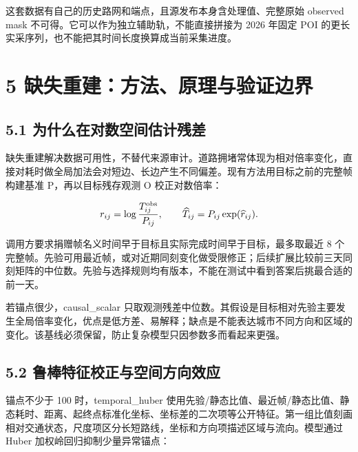 \documentclass[UTF8,10pt,a4paper,fontset=fandol]{ctexart}
\begin{document}
这套数据有自己的历史路网和端点，且源发布本身含处理值、完整原始 observed mask 不可得。它可以作为独立辅助轨，不能直接拼接为 2026 年固定 POI 的更长实采序列，也不能把其时间长度换算成当前采集进度。


\section*{5 缺失重建：方法、原理与验证边界}


\subsection*{5.1 为什么在对数空间估计残差}


缺失重建解决数据可用性，不替代来源审计。道路拥堵常体现为相对倍率变化，直接对耗时做全局加法会对短边、长边产生不同偏差。现有方法用目标之前的完整帧构建基准 P，再以目标残存观测 O 校正对数倍率：


\begin{equation}
r_{ij}=\log\frac{T^{\rm obs}_{ij}}{P_{ij}},
\qquad
\widehat T_{ij}=P_{ij}\exp(\widehat r_{ij}).
\end{equation}

调用方要求捐赠帧名义时间早于目标且实际完成时间早于目标，最多取最近 8 个完整帧。先验可用最近帧，或对近期同刻变化做受限修正；后续扩展比较前三天同刻矩阵的中位数。先验与选择规则均有版本，不能在测试中看到答案后挑最合适的前一天。


若锚点很少，causal\_\allowbreak{}scalar 只取观测残差中位数。其假设是目标相对先验主要发生全局倍率变化，优点是低方差、易解释；缺点是不能表达城市不同方向和区域的变化。该基线必须保留，防止复杂模型只因参数多而看起来更强。


\subsection*{5.2 鲁棒特征校正与空间方向效应}


锚点不少于 100 时，temporal\_\allowbreak{}huber 使用先验/\allowbreak{}静态比值、最近帧/\allowbreak{}静态比值、静态耗时、距离、起终点标准化坐标、坐标差的二次项等公开特征。第一组比值刻画相对交通状态，尺度项区分长短路线，坐标和方向项描述区域与流向。模型通过 Huber 加权岭回归抑制少量异常锚点：
\end{document}
